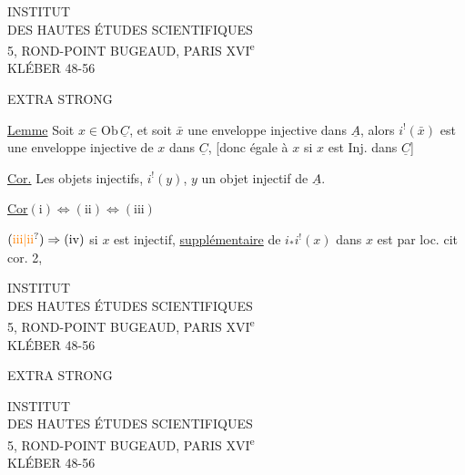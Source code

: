 

\begin{center}
INSTITUT\\
DES HAUTES ÉTUDES SCIENTIFIQUES\\
5, ROND-POINT BUGEAUD, PARIS XVI\textsuperscript{e}\\
KLÉBER 48-56
\end{center}

 EXTRA STRONG 



\uline{Lemme} Soit $x\in\mathrm{Ob}\,\underline C$, et soit $\bar x$ une enveloppe injective dans $\underline A$, alors $i^!(\bar x)$ est une enveloppe injective de $x$ dans $\underline C$, [donc égale à $x$ si $x$ est Inj. dans $\underline C$]

\uline{Cor.} Les objets injectifs,    $i^!(y)$, $y$ un objet injectif de $\underline A$.

\uline{Cor}\quad $(\mathrm i)\Longleftrightarrow(\mathrm{ii})\Longleftrightarrow(\mathrm{iii})$


$(\unsure{\mathrm{iii}|\mathrm{ii}})\Rightarrow(\mathrm{iv})$  si $x$ est injectif,  \uline{supplémentaire} de $i_*i^!(x)$ dans $x$ est    par loc. cit cor. 2,



\begin{center}
INSTITUT\\
DES HAUTES ÉTUDES SCIENTIFIQUES\\
5, ROND-POINT BUGEAUD, PARIS XVI\textsuperscript{e}\\
KLÉBER 48-56
\end{center}

 EXTRA STRONG 




\begin{center}
INSTITUT\\
DES HAUTES ÉTUDES SCIENTIFIQUES\\
5, ROND-POINT BUGEAUD, PARIS XVI\textsuperscript{e}\\
KLÉBER 48-56
\end{center}

